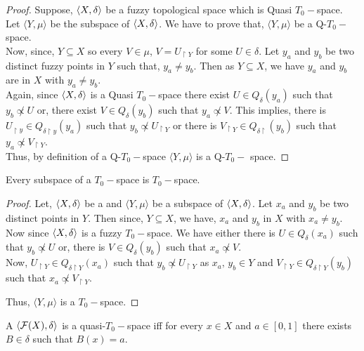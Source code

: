 \documentclass[../main-sheet.tex]{subfiles}
\begin{document}
\begin{proof}
    Suppose, \(\langle X, \delta \rangle\) be a fuzzy topological space which is Quasi \(T_0-\)space. Let \(\langle Y, \mu\rangle\) be the subspace of \(\langle X, \delta \rangle\). We have to prove that, \(\langle Y,\mu\rangle\) be a Q-\(T_0-\)space.\\

    Now, since, \(Y\subseteq X\) so every \(V\in \mu \), \(V=U_{\upharpoonright Y}\) for some \(U\in \delta\). Let \(y_a\) and \(y_b\) be two distinct fuzzy points in \(Y\) such that, \(y_a\neq y_b\). Then as \(Y\subseteq X\), we have \(y_a\) and \(y_b\) are in \(X\) with \(y_a\neq y_b\).\\

    Again, since \(\langle X, \delta \rangle\) is a Quasi \(T_0-\)space there exist \(U\in Q_\delta(y_a)\) such that \(y_b\not\propto U\) or, there exist \(V\in Q_\delta(y_b)\) such that \(y_a\not\propto V\). This implies, there is \(U_{\upharpoonright y}\in Q_{\delta\upharpoonright y}(y_a)\) such that \(y_b\not\propto U_{\upharpoonright Y}\) or there is \(V_{\upharpoonright Y} \in Q_{\delta\upharpoonright}(y_b)\) such that \(y_a\not\propto V_{\upharpoonright Y}\).\\

    Thus, by definition of a Q-\(T_0-\)space \(\langle Y, \mu\rangle\) is a Q-\(T_0-\) space.
\end{proof}
\begin{thm}
    Every subspace of a \(T_0-\)space is \(T_0-\)space.
\end{thm}
\begin{proof}
    Let, \(\langle X, \delta \rangle\) be a \fts\s and \(\langle Y,\mu\rangle\) be a subspace of \(\langle X, \delta \rangle\). Let \(x_a\) and \(y_b\) be two distinct points in \(Y\). Then since, \(Y\subseteq X\), we have, \(x_a\) and \(y_b\) in \(X\) with \(x_a\neq y_b\). Now since \(\langle X, \delta \rangle\) is a fuzzy \(T_0-\)space. We have either there is \(U\in Q_\delta(x_a)\) such that \(y_b\not\propto U\) or, there is \(V\in Q_\delta(y_b)\) such that \(x_a\not\propto V\).\\
    Now, \(U_{\upharpoonright Y}\in Q_{\delta\upharpoonright Y}(x_a)\) such that \(y_b\not\propto U_{\upharpoonright Y}\) as \(x_a,\,y_b\in Y\) and \(V_{\upharpoonright Y} \in Q_{\delta \upharpoonright Y}(y_b)\) such that \(x_a\not\propto V_{\upharpoonright Y}\).
    
    Thus, \(\langle Y,\mu\rangle\) is a \(T_0-\)space. 
\end{proof}
\begin{thm}
    A \fts \(\langle \mathcal{F}(X), \delta \rangle\) is a quasi-\(T_0-\)space iff for every \(x\in X\) and \(a\in [0,1]\) there exists \(B\in\delta\) such that \(B(x)=a\).
\end{thm}
\end{document}
